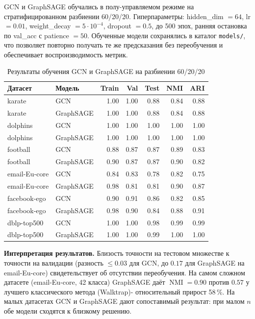 \documentclass[14pt,a4paper]{extarticle}
\begin{document}
GCN и GraphSAGE обучались в полу-управляемом режиме на стратифицированном разбиении 60/20/20. Гиперпараметры: hidden\_dim $= 64$, lr $= 0.01$, weight\_decay $= 5 \cdot 10^{-4}$, dropout $= 0.5$, до 500 эпох, ранняя остановка по val\_acc с patience $= 50$. Обученные модели сохранялись в каталог \texttt{models/}, что позволяет повторно получать те же предсказания без переобучения и обеспечивает воспроизводимость метрик.

\begin{table}[h]
\centering
\begin{tabular}{llrrrrr}
\toprule
Датасет & Модель & Train & Val & Test & NMI & ARI \\
\midrule
karate & GCN & 1.00 & 1.00 & 0.88 & 0.84 & 0.88 \\
karate & GraphSAGE & 1.00 & 1.00 & 0.88 & 0.84 & 0.88 \\
dolphins & GCN & 1.00 & 1.00 & 1.00 & 1.00 & 1.00 \\
dolphins & GraphSAGE & 1.00 & 1.00 & 1.00 & 1.00 & 1.00 \\
football & GCN & 0.88 & 0.87 & 0.87 & 0.89 & 0.83 \\
football & GraphSAGE & 0.90 & 0.87 & 0.87 & 0.90 & 0.82 \\
email-Eu-core & GCN & 0.84 & 0.83 & 0.78 & 0.82 & 0.75 \\
email-Eu-core & GraphSAGE & 0.98 & 0.81 & 0.81 & 0.90 & 0.87 \\
facebook-ego & GCN & 0.90 & 0.91 & 0.86 & 0.82 & 0.85 \\
facebook-ego & GraphSAGE & 0.98 & 0.90 & 0.84 & 0.88 & 0.91 \\
dblp-top500 & GCN & 1.00 & 1.00 & 0.98 & 0.99 & 0.99 \\
dblp-top500 & GraphSAGE & 1.00 & 1.00 & 0.99 & 1.00 & 1.00 \\
\bottomrule
\end{tabular}
\caption{Результаты обучения GCN и GraphSAGE на разбиении 60/20/20}
\label{tab:gnn}
\end{table}

\textbf{Интерпретация результатов.} Близость точности на тестовом множестве к точности на валидации (разность $\leq 0.03$ для GCN, до $0.17$ для GraphSAGE на email-Eu-core) свидетельствует об отсутствии переобучения. На самом сложном датасете (email-Eu-core, 42 класса) GraphSAGE даёт $\operatorname{NMI} = 0.90$ против $0.57$ у лучшего классического метода (Walktrap)- относительный прирост 58\,\%. На малых датасетах GCN и GraphSAGE дают сопоставимый результат: при малом $n$ обе модели сходятся к близкому решению.
\end{document}
